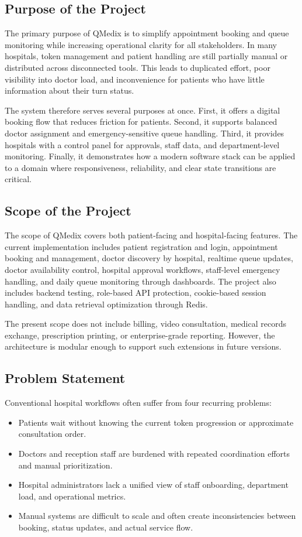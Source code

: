 \documentclass[12pt,onecolumn]{IEEEtran}
\begin{document}
\subsection{Purpose of the Project}
The primary purpose of QMedix is to simplify appointment booking and queue monitoring while increasing operational clarity for all stakeholders. In many hospitals, token management and patient handling are still partially manual or distributed across disconnected tools. This leads to duplicated effort, poor visibility into doctor load, and inconvenience for patients who have little information about their turn status.

The system therefore serves several purposes at once. First, it offers a digital booking flow that reduces friction for patients. Second, it supports balanced doctor assignment and emergency-sensitive queue handling. Third, it provides hospitals with a control panel for approvals, staff data, and department-level monitoring. Finally, it demonstrates how a modern software stack can be applied to a domain where responsiveness, reliability, and clear state transitions are critical.

\subsection{Scope of the Project}
The scope of QMedix covers both patient-facing and hospital-facing features. The current implementation includes patient registration and login, appointment booking and management, doctor discovery by hospital, realtime queue updates, doctor availability control, hospital approval workflows, staff-level emergency handling, and daily queue monitoring through dashboards. The project also includes backend testing, role-based API protection, cookie-based session handling, and data retrieval optimization through Redis.

The present scope does not include billing, video consultation, medical records exchange, prescription printing, or enterprise-grade reporting. However, the architecture is modular enough to support such extensions in future versions.

\subsection{Problem Statement}
Conventional hospital workflows often suffer from four recurring problems:
\begin{itemize}
    \item Patients wait without knowing the current token progression or approximate consultation order.
    \item Doctors and reception staff are burdened with repeated coordination efforts and manual prioritization.
    \item Hospital administrators lack a unified view of staff onboarding, department load, and operational metrics.
    \item Manual systems are difficult to scale and often create inconsistencies between booking, status updates, and actual service flow.
\end{itemize}
\end{document}
